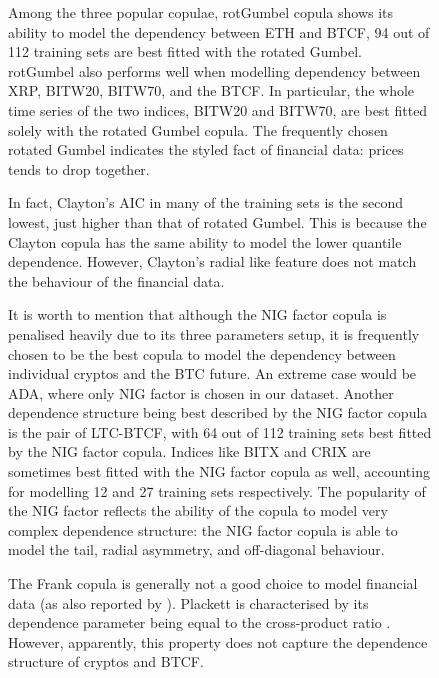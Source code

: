 \begin{figure}[!]
Among the three popular copulae, rotGumbel copula shows its ability to model the dependency between ETH and BTCF,
94 out of 112 training sets are best fitted with the rotated Gumbel.
rotGumbel also performs well when modelling dependency between XRP, BITW20, BITW70, and the BTCF.
In particular, the whole time series of the two indices, BITW20 and BITW70, are best fitted solely with the rotated Gumbel copula.
The frequently chosen rotated Gumbel indicates the styled fact of
financial data: prices tends to drop together.  

In fact, Clayton's AIC in many of the training sets is the second lowest, just higher than that of rotated Gumbel.
This is because the Clayton copula has the same ability to model the lower quantile dependence.
However, Clayton's radial like feature does not match the behaviour of
the financial data.


It is worth to mention that although the NIG factor copula is penalised heavily due to its three parameters setup,
it is frequently chosen to be the best copula to model the dependency
between individual cryptos and the BTC future. 
An extreme case would be ADA, where only NIG factor is chosen in our dataset.
Another dependence structure being best described by the NIG factor
copula is the pair of LTC-BTCF, with 
64 out of 112 training sets best fitted by the NIG factor copula.
Indices like BITX and CRIX are sometimes best fitted with the NIG
factor copula as well, accounting for modelling 12 and 27 training
sets respectively. 
The popularity of the NIG factor reflects the ability of the copula to
model very complex dependence structure: the 
NIG factor copula is able to model the tail, radial asymmetry, and
off-diagonal behaviour. 

The Frank copula is generally not a good choice to model financial
data (as also reported by \cite{barbi2014copula}).
Plackett is characterised by its dependence parameter being equal to
the cross-product ratio %
. 
However, apparently, this property does not capture the dependence
structure of cryptos and BTCF.


\begin{table}[t!]

%
    \label{tab:copulasection}
\end{table}


\end{figure}
